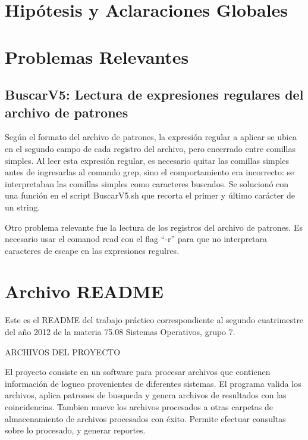\documentclass[a4paper,10pt,titlepage]{article}
\begin{document}

\section{Hip\'otesis y Aclaraciones Globales}

\section{Problemas Relevantes}

\subsection{BuscarV5: Lectura de expresiones regulares del archivo de patrones}

Según el formato del archivo de patrones, la expresión regular a aplicar se ubica en el segundo campo de cada registro del archivo, pero encerrado entre comillas simples. Al leer esta expresión regular, es necesario quitar las comillas simples antes de ingresarlas al comando grep, sino el comportamiento era incorrecto: se interpretaban las comillas simples como caracteres buscados. Se solucionó con una función en el script BuscarV5.sh que recorta el primer y último carácter de un string.

Otro problema relevante fue la lectura de los registros del archivo de patrones. Es necesario usar el comanod read con el flag “-r” para que no interpretara caracteres de escape en las expresiones regulres.

\section{Archivo README}


Este es el README del trabajo práctico correspondiente al segundo cuatrimestre del año 2012 de la materia 75.08 Sistemas Operativos, grupo 7.
 
ARCHIVOS DEL PROYECTO
 
El proyecto consiste en un software para procesar archivos que contienen información de logueo provenientes de diferentes sistemas. El programa valida los archivos, aplica patrones de busqueda y genera archivos de resultados con las coincidencias. Tambien mueve los archivos procesados a otras carpetas de almacenamiento de archivos procesados con éxito. Permite efectuar consultas sobre lo procesado, y generar reportes.
\end{document}
